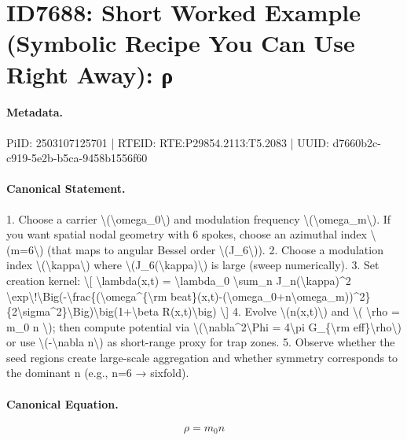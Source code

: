 \section*{ID7688: Short Worked Example (Symbolic Recipe You Can Use Right Away): ρ}
\paragraph{Metadata.}
PiID: 2503107125701 | RTEID: RTE:P29854.2113:T5.2083 | UUID: d7660b2c-c919-5e2b-b5ca-9458b1556f60

\paragraph{Canonical Statement.}
1. Choose a carrier \textbackslash{}(\textbackslash{}omega\_0\textbackslash{}) and modulation frequency \textbackslash{}(\textbackslash{}omega\_m\textbackslash{}). If you want spatial nodal geometry with 6 spokes, choose an azimuthal index \textbackslash{}(m=6\textbackslash{}) (that maps to angular Bessel order \textbackslash{}(J\_6\textbackslash{})). 2. Choose a modulation index \textbackslash{}(\textbackslash{}kappa\textbackslash{}) where \textbackslash{}(J\_6(\textbackslash{}kappa)\textbackslash{}) is large (sweep numerically). 3. Set creation kernel: \textbackslash{}[ \textbackslash{}lambda(x,t) = \textbackslash{}lambda\_0 \textbackslash{}sum\_n J\_n(\textbackslash{}kappa)\textasciicircum{}2 \textbackslash{}exp\textbackslash{}!\textbackslash{}Big(-\textbackslash{}frac\{(\textbackslash{}omega\textasciicircum{}\{\textbackslash{}rm beat\}(x,t)-(\textbackslash{}omega\_0+n\textbackslash{}omega\_m))\textasciicircum{}2\}\{2\textbackslash{}sigma\textasciicircum{}2\}\textbackslash{}Big)\textbackslash{}big(1+\textbackslash{}beta R(x,t)\textbackslash{}big) \textbackslash{}] 4. Evolve \textbackslash{}(n(x,t)\textbackslash{}) and \textbackslash{}( \textbackslash{}rho = m\_0 n \textbackslash{}); then compute potential via \textbackslash{}(\textbackslash{}nabla\textasciicircum{}2\textbackslash{}Phi = 4\textbackslash{}pi G\_\{\textbackslash{}rm eff\}\textbackslash{}rho\textbackslash{}) or use \textbackslash{}(-\textbackslash{}nabla n\textbackslash{}) as short-range proxy for trap zones. 5. Observe whether the seed regions create large-scale aggregation and whether symmetry corresponds to the dominant n (e.g., n=6 → sixfold).

\paragraph{Canonical Equation.}
\[
\rho = m_0 n
\]

